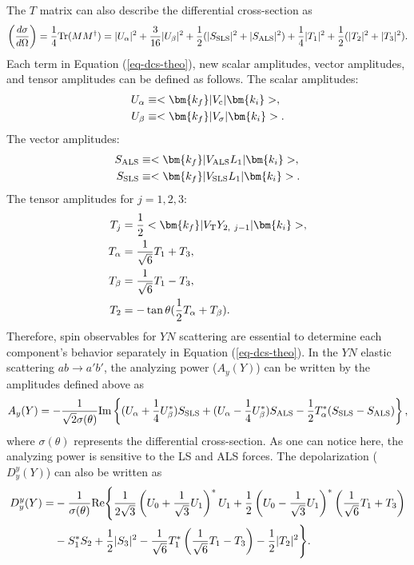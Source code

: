 The $T$ matrix can also describe the differential cross-section \cite{Ishikawa-2004} as
\begin{equation}
  \left( \frac{d\sigma}{d\Omega} \right) = \frac{1}{4}{\rm Tr}(MM^{\dagger}) = |U_{\alpha}|^{2} + \frac{3}{16}|U_{\beta}|^{2} 
  + \frac{1}{2}(|S_{\rm SLS}|^{2} + |S_{\rm ALS}|^{2}) + \frac{1}{4}|T_{1}|^{2} + \frac{1}{2}(|T_{2}|^{2} + |T_{3}|^{2}).
  \label{eq-dcs-theo}
\end{equation}
Each term in Equation (\ref{eq-dcs-theo}), new scalar amplitudes, vector amplitudes, and tensor amplitudes can be defined as follows. The scalar amplitudes:
\begin{align}  
  U_{\alpha} &\equiv <\bm{k_f}|V_{\rm c}|\bm{k_i}> ,\\
  U_{\beta} &\equiv <\bm{k_f}|V_{\rm \sigma}|\bm{k_i}>.
  \label{eq-scalarAmp}
\end{align}
The vector amplitudes:
\begin{align}  
  S_{\rm ALS} &\equiv <\bm{k_f}|V_{\rm ALS}L_{1}|\bm{k_i}>, \\
  S_{\rm SLS} &\equiv <\bm{k_f}|V_{\rm SLS}L_{1}|\bm{k_i}>.
  \label{eq-vectorAmp}
\end{align}
The tensor amplitudes for $j=1,2,3$:
\begin{align}  
  T_{j} &= \frac{1}{2} <\bm{k_f}|V_{\rm T}Y_{2,\ j-1}|\bm{k_i}>, \\
  T_{\alpha} &= \frac{1}{\sqrt{6}}T_{1} + T_{3}, \\
  T_{\beta} &= \frac{1}{\sqrt{6}}T_{1} - T_{3}, \\
  T_{2} &= -\tan{\theta} (\frac{1}{2} T_{\alpha} + T_{\beta}).
  \label{eq-tensorAmp}
\end{align}
Therefore, spin observables for $YN$ scattering are essential to determine each component's behavior separately in Equation (\ref{eq-dcs-theo}). In the $YN$ elastic scattering $ab\to a'b'$, the analyzing power ($A_{y}(Y)$) can be written by the amplitudes defined above as
\begin{equation}
  A_{y}(Y) = -\frac{1}{\sqrt{2}\sigma(\theta)} {\rm Im} \left\{ 
  (U_{\alpha} + \frac{1}{4}U_{\beta}^{*})S_{\rm SLS} 
  + (U_{\alpha} - \frac{1}{4}U_{\beta}^{*})S_{\rm ALS} 
  - \frac{1}{2}T_{\alpha}^{*}(S_{\rm SLS} - S_{\rm ALS}) \right\},
\end{equation}
where $\sigma(\theta)$ represents the differential cross-section. As one can notice here, the analyzing power is sensitive to the LS and ALS forces. The depolarization ($D^{y}_{y}(Y)$) can also be written as
\begin{equation}
\begin{split}
  D^{y}_{y}(Y) =& -\frac{1}{\sigma(\theta)} {\rm Re} \Biggl\{ 
  \frac{1}{2\sqrt{3}} \left( U_{0} + \frac{1}{\sqrt{3}}U_{1} \right)^{*}U_{1} + 
  \frac{1}{2} \left( U_{0} - \frac{1}{\sqrt{3}}U_{1} \right)^{*} \left( \frac{1}{\sqrt{6}}T_{1} + T_{3} \right) \\
  & - S^{*}_{1}S_{2} + \frac{1}{2}|S_{3}|^{2} - \frac{1}{\sqrt{6}}T^{*}_{1} \left( \frac{1}{\sqrt{6}}T_{1} - T_{3} \right) - \frac{1}{2}|T_{2}|^{2} \Biggl\}.
\end{split}
\end{equation}
